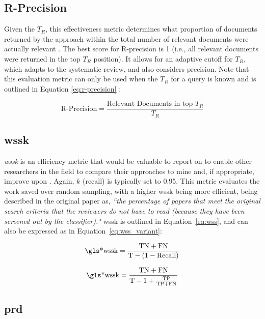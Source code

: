 \documentclass[10pt,oneside]{book}
\begin{document}
\subsection{R-Precision}
Given the \textbf{$T_R$}, this effectiveness metric determines what proportion of documents returned by the approach within the total number of relevant documents were actually relevant \cite{manning_introduction_2008}. The best score for R-precision is 1 (i.e., all relevant documents were returned in the top \textbf{$T_R$} position). It allows for an adaptive cutoff for \textbf{$T_R$}, which adapts to the systematic review, and also considers precision. Note that this evaluation metric can only be used when the \textbf{$T_R$} for a query is known and is outlined in Equation \ref{eq:r-precision} :

\begin{equation}
\text{R-Precision} = \frac{\text{Relevant Documents in top } T_R}{T_R}
\label{eq:r-precision}
\end{equation}
\subsection{\gls*{wssk}}

\emph{\gls*{wssk}} is an efficiency metric that would be valuable to report on to enable other researchers in the field to compare their approaches to mine and, if appropriate, improve upon \cite{kusa_analysis_2023, cohen_reducing_2006}. Again, $k$ (recall) is typically set to 0.95. This metric evaluates the work saved over random sampling, with a higher \gls*{wssk} being more efficient, being described in the original paper as, \emph{``the percentage of papers that meet the original search criteria that the reviewers do not have to read (because they have been screened out by the classifier)."} \gls*{wssk} is outlined in Equation~\ref{eq:wss}, and can also be expressed as in Equation~\ref{eq:wss_variant}:


\begin{equation}
\text{\gls*{wssk}} = \frac{\text{TN} + \text{FN}}{\text{T} - (1 - \text{Recall})}
\label{eq:wss}
\end{equation}

\begin{equation}
\text{\gls*{wssk}} = \frac{\text{TN} + \text{FN}}{\text{T} - 1 + \frac{\text{TP}}{\text{TP} + \text{FN}}}
\label{eq:wss_variant}
\end{equation}

\subsection{\gls*{prd}}
\end{document}
